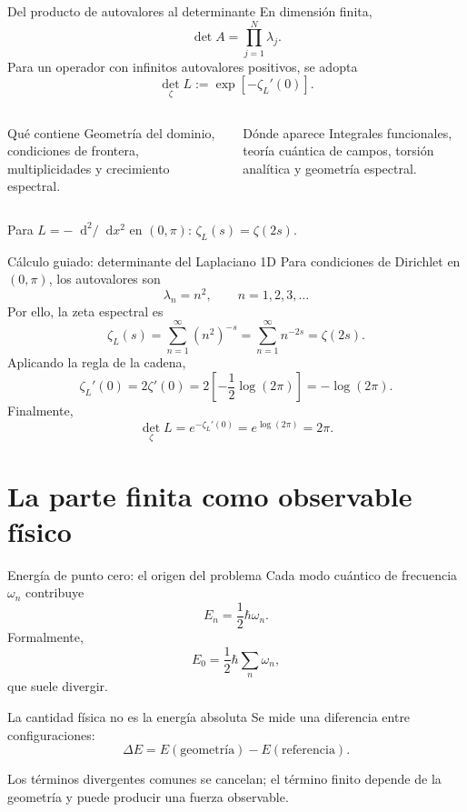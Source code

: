 \documentclass[aspectratio=169,11pt]{beamer}
\newcommand{\dd}{\mathop{}\!\mathrm{d}}
\begin{document}
\begin{frame}{Del producto de autovalores al determinante}
  En dimensión finita,
  \[
    \det A=\prod_{j=1}^{N}\lambda_j.
  \]
  \pause
  Para un operador con infinitos autovalores positivos, se adopta
  \[
    \boxed{\det_{\zeta}L:=\exp[-\zeta_L'(0)]}.
  \]
  \pause
  \begin{columns}[T,onlytextwidth]
      \begin{block}{Qué contiene}
        Geometría del dominio, condiciones de frontera, multiplicidades y crecimiento
        espectral.
      \end{block}
      \pause
      \begin{block}{Dónde aparece}
        Integrales funcionales, teoría cuántica de campos, torsión analítica y
        geometría espectral.
      \end{block}
  \end{columns}
  \pause
  \vfill
  \centering Para $L=-\dd^2/\dd x^2$ en $(0,\pi)$: $\zeta_L(s)=\zeta(2s)$.
\end{frame}

\begin{frame}{Cálculo guiado: determinante del Laplaciano 1D}
  Para condiciones de Dirichlet en $(0,\pi)$, los autovalores son
  \[
    \lambda_n=n^2,\qquad n=1,2,3,\ldots
  \]
  \pause
  Por ello, la zeta espectral es
  \[
    \zeta_L(s)=\sum_{n=1}^{\infty}(n^2)^{-s}
      =\sum_{n=1}^{\infty}n^{-2s}=\zeta(2s).
  \]
  \pause
  Aplicando la regla de la cadena,
  \[
    \zeta_L'(0)=2\zeta'(0)
      =2\left[-\frac12\log(2\pi)\right]
      =-\log(2\pi).
  \]
  \pause
  Finalmente,
  \[
    \boxed{\det_\zeta L=e^{-\zeta_L'(0)}=e^{\log(2\pi)}=2\pi.}
  \]
\end{frame}

\section{La parte finita como observable físico}

\begin{frame}{Energía de punto cero: el origen del problema}
  Cada modo cuántico de frecuencia $\omega_n$ contribuye
  \[
    E_n=\frac12\hbar\omega_n.
  \]
  \pause
  Formalmente,
  \[
    E_0=\frac12\hbar\sum_n\omega_n,
  \]
  que suele divergir.
  \pause
  \begin{alertblock}{La cantidad física no es la energía absoluta}
    Se mide una diferencia entre configuraciones:
    \[
      \Delta E=E(\text{geometría})-E(\text{referencia}).
    \]
  \end{alertblock}
  \pause
  Los términos divergentes comunes se cancelan; el término finito depende de la
  geometría y puede producir una fuerza observable.
\end{frame}
\end{document}
